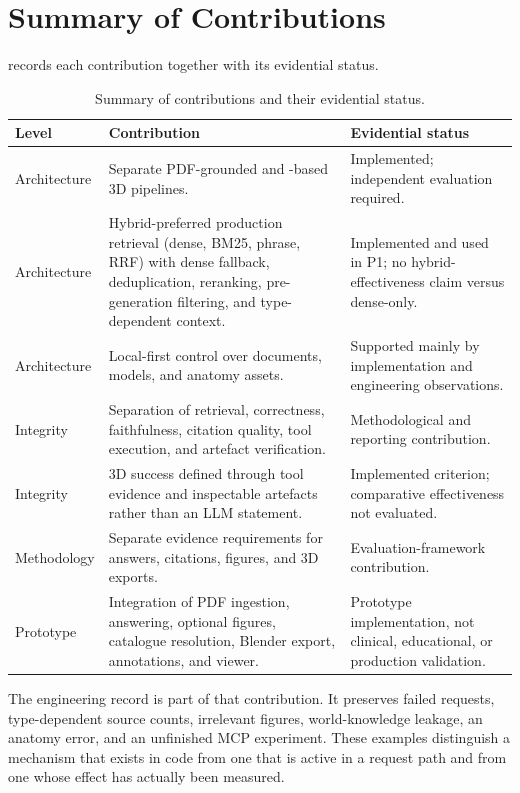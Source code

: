 \section{Summary of Contributions}
\label{sec:conclusion-contributions}

 records each contribution together with its evidential status.

\begin{table}[htbp]
  \centering
  \caption{Summary of contributions and their evidential status.}
  \label{tab:conclusion-contributions}
  \small
  \begin{tabularx}{\textwidth}{L{0.20\textwidth}Y L{0.25\textwidth}}
    \toprule
    Level & Contribution & Evidential status \\
    \midrule
    Architecture & Separate PDF-grounded \RAG{} and \MCP{}-based 3D pipelines. & Implemented; independent evaluation required. \\
    Architecture & Hybrid-preferred production retrieval (dense, BM25, phrase, RRF) with dense fallback, deduplication, reranking, pre-generation filtering, and type-dependent context. & Implemented and used in P1; no hybrid-effectiveness claim versus dense-only. \\
    Architecture & Local-first control over documents, models, and anatomy assets. & Supported mainly by implementation and engineering observations. \\
    Integrity & Separation of retrieval, correctness, faithfulness, citation quality, tool execution, and artefact verification. & Methodological and reporting contribution. \\
    Integrity & 3D success defined through tool evidence and inspectable artefacts rather than an LLM statement. & Implemented criterion; comparative effectiveness not evaluated. \\
    Methodology & Separate evidence requirements for answers, citations, figures, and 3D exports. & Evaluation-framework contribution. \\
    Prototype & Integration of PDF ingestion, answering, optional figures, catalogue resolution, Blender export, annotations, and viewer. & Prototype implementation, not clinical, educational, or production validation. \\
    \bottomrule
  \end{tabularx}
\end{table}

The engineering record is part of that contribution. It preserves failed requests, type-dependent source counts, irrelevant figures, world-knowledge leakage, an anatomy error, and an unfinished MCP experiment. These examples distinguish a mechanism that exists in code from one that is active in a request path and from one whose effect has actually been measured.

